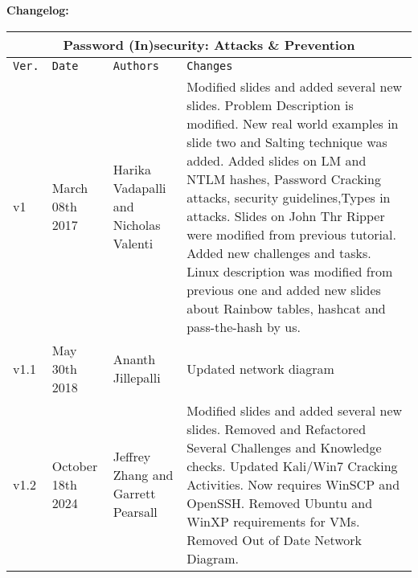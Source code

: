 \documentclass[12pt]{article}
\begin{document}
\pagebreak	
\textbf{Changelog:}
\label{changelog}
\vspace{6mm}


\begin{tabular}{ |p{1cm}|p{3cm}|p{3cm}|p{5cm}|  }
\hline
\multicolumn{4}{|c|}{Password (In)security: Attacks \& Prevention} \\
\hline
\texttt{Ver.} & \texttt{Date} & \texttt{Authors} & \texttt{Changes} \\
\hline
v1 & March 08th 2017 & Harika Vadapalli and Nicholas Valenti & Modified slides and added several new slides. Problem Description is modified. New real world examples in slide two and Salting technique was added. Added slides on LM and NTLM hashes, Password Cracking attacks, security guidelines,Types in attacks. Slides on John Thr Ripper were modified from previous tutorial. Added new challenges and tasks. Linux description was modified from previous one and added new slides about Rainbow tables, hashcat and pass-the-hash by us.  \\
\hline
v1.1 & May 30th 2018 & Ananth Jillepalli & Updated network diagram \\
\hline 
v1.2 & October 18th 2024 & Jeffrey Zhang and Garrett Pearsall & Modified slides and added several new slides. Removed and Refactored Several Challenges and Knowledge checks. Updated Kali/Win7 Cracking Activities. Now requires WinSCP and OpenSSH. Removed Ubuntu and WinXP requirements for VMs. Removed Out of Date Network Diagram.\\
\hline
\end{tabular}

\pagebreak

\end{document}
